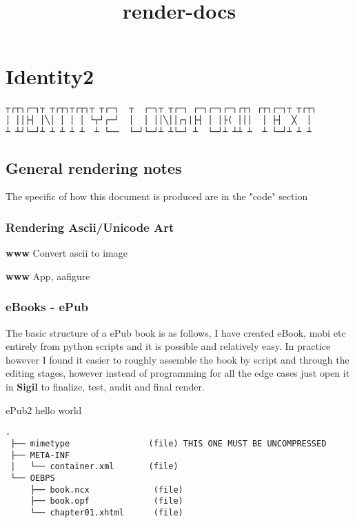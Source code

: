 \documentclass[
]{article}
\title{render-docs}
\author{}
\date{}
\begin{document}
\maketitle

\section{Identity2}

\begin{verbatim}
┬┌┬┐┌─┐┬ ┬┌┬┐┬┌┬┐┬ ┬┌─┐  ┬  ┌─┐┬ ┬┌─┐ ┌─┐┌─┐┌─╮┌┬┐ ┌┬┐┌─┐┬ ┬┌┬┐
│ ││├┤ │╲│ │ │ │ └┬┘┌─┘  │  │ ││╲││┌┐|├┤ │ │├( │││  │ ├┤  ╳  │
┴ ┴┘└─┘┴ ┴ ┴ ┴ ┴  ┴ └──  └─┘└─┘┴ ┴└─┘ ┴  └─┘┴ ┴┴ ┴  ┴ └─┘┴ ┴ ┴
\end{verbatim}

\subsection{General rendering notes}

The specific of how this document is produced are in the "code" section

\subsubsection{Rendering Ascii/Unicode Art}

\textbf{www} Convert ascii to image

\textbf{www} App, aafigure

\subsubsection{eBooks - ePub}

The basic structure of a ePub book is as follows, I have created eBook,
mobi etc entirely from python scripts and it is possible and relatively
easy. In practice however I found it easier to roughly assemble the book
by script and through the editing stages, however instead of programming
for all the edge cases just open it in \textbf{Sigil} to finalize, test,
audit and final render.

ePub2 hello world

\begin{verbatim}
.
 ├── mimetype                (file) THIS ONE MUST BE UNCOMPRESSED
 ├── META-INF
 │   └── container.xml       (file)
 └── OEBPS
     ├── book.ncx             (file)
     ├── book.opf             (file)
     └── chapter01.xhtml      (file)
\end{verbatim}
\end{document}
